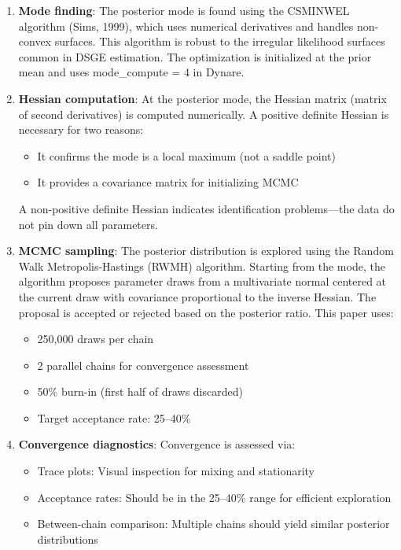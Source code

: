 \documentclass[12pt]{article}
\begin{document}
\begin{enumerate}
    \item \textbf{Mode finding}: The posterior mode is found using the CSMINWEL algorithm (Sims, 1999), which uses numerical derivatives and handles non-convex surfaces. This algorithm is robust to the irregular likelihood surfaces common in DSGE estimation. The optimization is initialized at the prior mean and uses mode\_compute = 4 in Dynare.
    
    \item \textbf{Hessian computation}: At the posterior mode, the Hessian matrix (matrix of second derivatives) is computed numerically. A positive definite Hessian is necessary for two reasons:
    \begin{itemize}
        \item It confirms the mode is a local maximum (not a saddle point)
        \item It provides a covariance matrix for initializing MCMC
    \end{itemize}
    A non-positive definite Hessian indicates identification problems---the data do not pin down all parameters.
    
    \item \textbf{MCMC sampling}: The posterior distribution is explored using the Random Walk Metropolis-Hastings (RWMH) algorithm. Starting from the mode, the algorithm proposes parameter draws from a multivariate normal centered at the current draw with covariance proportional to the inverse Hessian. The proposal is accepted or rejected based on the posterior ratio. This paper uses:
    \begin{itemize}
        \item 250,000 draws per chain
        \item 2 parallel chains for convergence assessment
        \item 50\% burn-in (first half of draws discarded)
        \item Target acceptance rate: 25--40\%
    \end{itemize}
    
    \item \textbf{Convergence diagnostics}: Convergence is assessed via:
    \begin{itemize}
        \item Trace plots: Visual inspection for mixing and stationarity
        \item Acceptance rates: Should be in the 25--40\% range for efficient exploration
        \item Between-chain comparison: Multiple chains should yield similar posterior distributions
    \end{itemize}
\end{enumerate}
\end{document}
